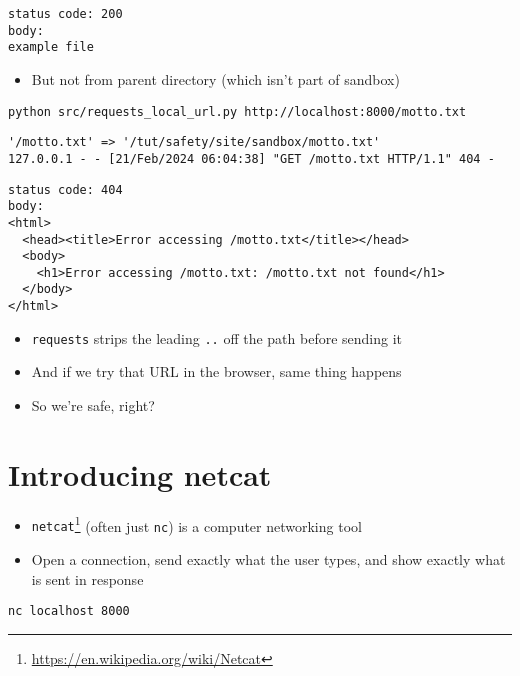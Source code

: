 \documentclass[krantzl]{krantz}
\newcommand{\hreffoot}[2]{{#1}\footnote{\href{#2}{#2}}}
\begin{document}
\begin{lstlisting}[frame=tblr,backgroundcolor=\color{black!5}]
status code: 200
body:
example file
\end{lstlisting}

\begin{itemize}
\item But not from parent directory (which isn’t part of sandbox)

\end{itemize}
\begin{lstlisting}[frame=tblr]
python src/requests_local_url.py http://localhost:8000/motto.txt
\end{lstlisting}

\begin{lstlisting}[frame=tblr,backgroundcolor=\color{black!5}]
'/motto.txt' => '/tut/safety/site/sandbox/motto.txt'
127.0.0.1 - - [21/Feb/2024 06:04:38] "GET /motto.txt HTTP/1.1" 404 -
\end{lstlisting}

\begin{lstlisting}[frame=tblr,backgroundcolor=\color{black!5}]
status code: 404
body:
<html>
  <head><title>Error accessing /motto.txt</title></head>
  <body>
    <h1>Error accessing /motto.txt: /motto.txt not found</h1>
  </body>
</html>
\end{lstlisting}

\begin{itemize}
\item \texttt{requests} strips the leading \texttt{..} off the path before sending it

\item And if we try that URL in the browser, same thing happens

\item So we’re safe, right?

\end{itemize}
\section{Introducing netcat}
\begin{itemize}
\item \hreffoot{\texttt{netcat}}{https://en.wikipedia.org/wiki/Netcat} (often just \texttt{nc}) is a computer networking tool

\item Open a connection, send exactly what the user types, and show exactly what is sent in response

\end{itemize}
\begin{lstlisting}[frame=tblr]
nc localhost 8000
\end{lstlisting}
\end{document}
